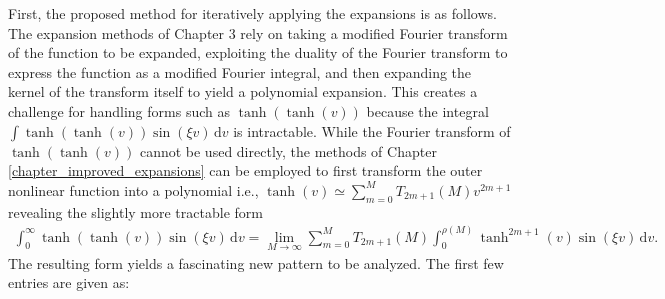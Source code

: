 First, the proposed method for iteratively applying the expansions is as follows.  The expansion methods of Chapter 3 rely on taking a modified Fourier transform of the function to be expanded, exploiting the duality of the Fourier transform to express the function as a modified Fourier integral, and then expanding the kernel of the transform itself to yield a polynomial expansion.  This creates a challenge for handling forms such as $\tanh(\tanh(v))$ because the integral $\int \! \tanh(\tanh(v))\sin(\xi v) \, \mathrm{d}v$ is intractable.  While the Fourier transform of $\tanh(\tanh(v))$ cannot be used directly, the methods of Chapter \ref{chapter_improved_expansions} can be employed to first transform the outer nonlinear function into a polynomial i.e., $\tanh(v) \simeq \sum_{m=0}^{M} T_{2m+1}(M) v^{2m+1}$ revealing the slightly more tractable form
\begin{align}
	\int_{0}^{\infty} \! 
	\tanh(\tanh(v)) \sin(\xi v)
	\, \mathrm{d} v =
	\lim_{M \to \infty} \sum_{m=0}^{M} T_{2m+1}(M) \int_0^{\rho(M)} \! \tanh^{2m+1}(v) \sin(\xi v) \, \mathrm{d}v.
\end{align}
The resulting form yields a fascinating new pattern to be analyzed.  The first few entries are given as:
